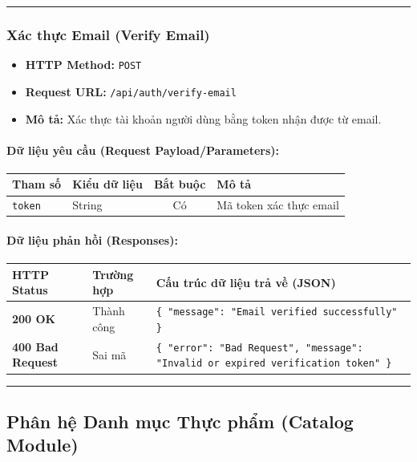 \documentclass[12pt,a4paper]{article}
\begin{document}
\vskip 0.4cm
\noindent\rule{\textwidth}{0.3pt}
\vskip 0.4cm

\subsubsection{Xác thực Email (Verify Email)}
\begin{itemize}[leftmargin=*]
    \item \textbf{HTTP Method:} \texttt{POST}
    \item \textbf{Request URL:} \texttt{/api/auth/verify-email}
    \item \textbf{Mô tả:} Xác thực tài khoản người dùng bằng token nhận được từ email.
\end{itemize}

\paragraph{Dữ liệu yêu cầu (Request Payload/Parameters):}
\begin{longtable}{|>{\raggedright\arraybackslash}p{2.8cm}|>{\raggedright\arraybackslash}p{2.2cm}|c|>{\raggedright\arraybackslash}p{7.0cm}|}
\hline
\textbf{Tham số} & \textbf{Kiểu dữ liệu} & \textbf{Bắt buộc} & \textbf{Mô tả} \\ \hline
\endhead
\texttt{token} & String & Có & Mã token xác thực email \\ \hline
\end{longtable}

\paragraph{Dữ liệu phản hồi (Responses):}
\begin{longtable}{|>{\raggedright\arraybackslash}p{2.8cm}|>{\raggedright\arraybackslash}p{3.2cm}|>{\raggedright\arraybackslash}p{8.0cm}|}
\hline
\textbf{HTTP Status} & \textbf{Trường hợp} & \textbf{Cấu trúc dữ liệu trả về (JSON)} \\ \hline
\endhead
\textbf{200 OK} & Thành công & \texttt{\{ "message": "Email verified successfully" \}} \\ \hline
\textbf{400 Bad Request} & Sai mã & \texttt{\{ "error": "Bad Request", "message": "Invalid or expired verification token" \}} \\ \hline
\end{longtable}

\vskip 0.4cm
\noindent\rule{\textwidth}{0.3pt}
\vskip 0.4cm

\subsection{Phân hệ Danh mục Thực phẩm (Catalog Module)}
\end{document}
